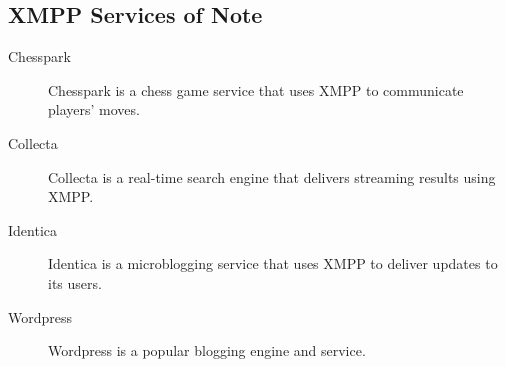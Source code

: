 \subsection*{XMPP Services of Note}

\begin{description}
\item[Chesspark] Chesspark is a chess game service that uses XMPP to communicate players' moves.
\item[Collecta]  Collecta is a real-time search engine that delivers streaming results using XMPP.
\item[Identica]  Identica is a microblogging service that uses XMPP to deliver updates to its users.
\item[Wordpress]  Wordpress is a popular blogging engine and service.
\end{description}
